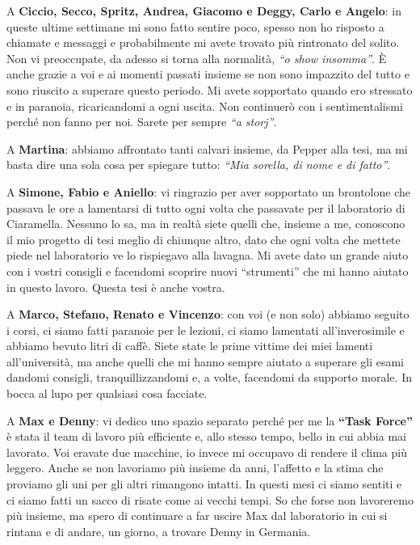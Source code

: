 A \textbf{Ciccio, Secco, Spritz, Andrea, Giacomo e Deggy, Carlo e Angelo}: in queste ultime settimane mi sono fatto sentire poco, spesso non ho risposto a chiamate e messaggi e probabilmente mi avete trovato più rintronato del solito. Non vi preoccupate, da adesso si torna alla normalità, \textit{“o show insomma”}. È anche grazie a voi e ai momenti passati insieme se non sono impazzito del tutto e sono riuscito a superare questo periodo. Mi avete sopportato quando ero stressato e in paranoia, ricaricandomi a ogni uscita. Non continuerò con i sentimentalismi perché non fanno per noi. Sarete per sempre \textit{“a storj”}.

A \textbf{Martina}: abbiamo affrontato tanti calvari insieme, da Pepper alla tesi, ma mi basta dire una sola cosa per spiegare tutto: \textit{“Mia sorella, di nome e di fatto”}.

A \textbf{Simone, Fabio e Aniello}: vi ringrazio per aver sopportato un brontolone che passava le ore a lamentarsi di tutto ogni volta che passavate per il laboratorio di Ciaramella. Nessuno lo sa, ma in realtà siete quelli che, insieme a me, conoscono il mio progetto di tesi meglio di chiunque altro, dato che ogni volta che mettete piede nel laboratorio ve lo rispiegavo alla lavagna. Mi avete dato un grande aiuto con i vostri consigli e facendomi scoprire nuovi “strumenti” che mi hanno aiutato in questo lavoro. Questa tesi è anche vostra.

A \textbf{Marco, Stefano, Renato e Vincenzo}: con voi (e non solo) abbiamo seguito i corsi, ci siamo fatti paranoie per le lezioni, ci siamo lamentati all'inverosimile e abbiamo bevuto litri di caffè. Siete state le prime vittime dei miei lamenti all'università, ma anche quelli che mi hanno sempre aiutato a superare gli esami dandomi consigli, tranquillizzandomi e, a volte, facendomi da supporto morale. In bocca al lupo per qualsiasi cosa facciate.

A \textbf{Max e Denny}: vi dedico uno spazio separato perché per me la \textbf{“Task Force”} è stata il team di lavoro più efficiente e, allo stesso tempo, bello in cui abbia mai lavorato. Voi eravate due macchine, io invece mi occupavo di rendere il clima più leggero. Anche se non lavoriamo più insieme da anni, l'affetto e la stima che proviamo gli uni per gli altri rimangono intatti. In questi mesi ci siamo sentiti e ci siamo fatti un sacco di risate come ai vecchi tempi. So che forse non lavoreremo più insieme, ma spero di continuare a far uscire Max dal laboratorio in cui si rintana e di andare, un giorno, a trovare Denny in Germania.

